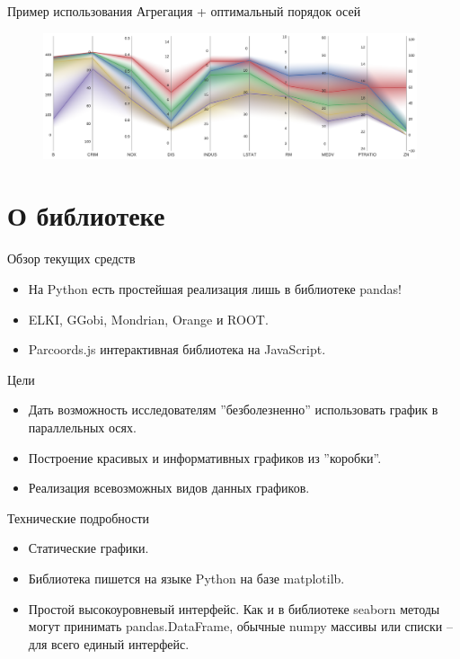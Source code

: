\documentclass[fleqn, xcolor=x11names]{beamer}
\begin{document}
\begin{frame}{Пример использования}
    Агрегация + оптимальный порядок осей

    \begin{figure}[htb]
        \centering
        \includegraphics[width=11cm]{housing_example_5.pdf}
    \end{figure}

\end{frame}

\section{О библиотеке}

\begin{frame}{Обзор текущих средств}

    \begin{itemize}
        \item На Python есть простейшая реализация лишь в библиотеке pandas!
        \item ELKI, GGobi, Mondrian, Orange и ROOT.
        \item Parcoords.js интерактивная библиотека на JavaScript.
    \end{itemize}

\end{frame}

\begin{frame}{Цели}
    \begin{itemize}
        \item Дать возможность исследователям ''безболезненно'' использовать график
              в параллельных осях.
        \item Построение красивых и информативных графиков из ''коробки''.
        \item Реализация всевозможных видов данных графиков.
    \end{itemize}
\end{frame}

\begin{frame}{Технические подробности}
    \begin{itemize}
        \item Статические графики.
        \item Библиотека пишется на языке Python на базе matplotilb.
        \item Простой высокоуровневый интерфейс. Как и в библиотеке seaborn методы могут принимать pandas.DataFrame,
              обычные numpy массивы или списки -- для всего единый интерфейс.
    \end{itemize}
\end{frame}
\end{document}
